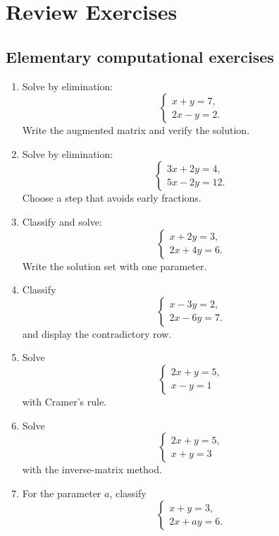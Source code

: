\section{Review Exercises}

\subsection{Elementary computational exercises}

\begin{enumerate}
\item Solve by elimination:
\[
\begin{cases}
x+y=7,\\
2x-y=2.
\end{cases}
\]
Write the augmented matrix and verify the solution.

\item Solve by elimination:
\[
\begin{cases}
3x+2y=4,\\
5x-2y=12.
\end{cases}
\]
Choose a step that avoids early fractions.

\item Classify and solve:
\[
\begin{cases}
x+2y=3,\\
2x+4y=6.
\end{cases}
\]
Write the solution set with one parameter.

\item Classify
\[
\begin{cases}
x-3y=2,\\
2x-6y=7.
\end{cases}
\]
and display the contradictory row.

\item Solve
\[
\begin{cases}
2x+y=5,\\
x-y=1
\end{cases}
\]
with Cramer's rule.

\item Solve
\[
\begin{cases}
2x+y=5,\\
x+y=3
\end{cases}
\]
with the inverse-matrix method.

\item For the parameter $a$, classify
\[
\begin{cases}
x+y=3,\\
2x+ay=6.
\end{cases}
\]


\end{enumerate}
